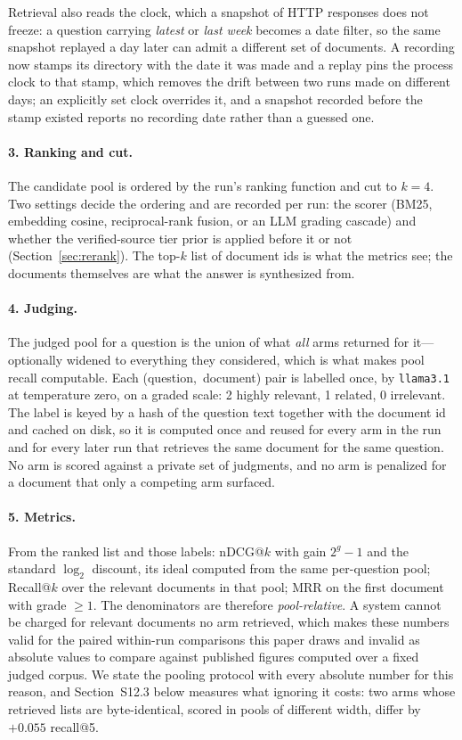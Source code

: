 \documentclass[acmsmall,anonymous,screen]{acmart}
\begin{document}
Retrieval also reads the clock, which a snapshot of HTTP responses does not
freeze: a question carrying \emph{latest} or \emph{last week} becomes a date
filter, so the same snapshot replayed a day later can admit a different set of
documents. A recording now stamps its directory with the date it was made and
a replay pins the process clock to that stamp, which removes the drift between
two runs made on different days; an explicitly set clock overrides it, and a
snapshot recorded before the stamp existed reports no recording date rather
than a guessed one.

\paragraph{3. Ranking and cut.} The candidate pool is ordered by the run's
ranking function and cut to $k=4$. Two settings decide the ordering and are
recorded per run: the scorer (BM25, embedding cosine, reciprocal-rank fusion,
or an LLM grading cascade) and whether the verified-source tier prior is
applied before it or not (Section~\ref{sec:rerank}). The top-$k$ list of
document ids is what the metrics see; the documents themselves are what the
answer is synthesized from.

\paragraph{4. Judging.} The judged pool for a question is the union of what
\emph{all} arms returned for it---optionally widened to everything they
considered, which is what makes pool recall computable. Each
(question,~document) pair is labelled once, by \texttt{llama3.1} at temperature
zero, on a graded scale: 2 highly relevant, 1 related, 0 irrelevant. The label
is keyed by a hash of the question text together with the document id and
cached on disk, so it is computed once and reused for every arm in the run and
for every later run that retrieves the same document for the same question. No
arm is scored against a private set of judgments, and no arm is penalized for a
document that only a competing arm surfaced.

\paragraph{5. Metrics.} From the ranked list and those labels:
nDCG@$k$ with gain $2^g-1$ and the standard $\log_2$ discount, its ideal
computed from the same per-question pool; Recall@$k$ over the relevant
documents in that pool; MRR on the first document with grade $\geq 1$. The
denominators are therefore \emph{pool-relative}. A system cannot be charged for
relevant documents no arm retrieved, which makes these numbers valid for the
paired within-run comparisons this paper draws and invalid as absolute values
to compare against published figures computed over a fixed judged corpus. We
state the pooling protocol with every absolute number for this reason, and
Section~S12.3 below measures what ignoring it costs: two arms whose
retrieved lists are byte-identical, scored in pools of different width, differ
by $+0.055$ recall@5.
\end{document}

